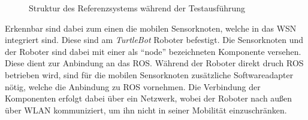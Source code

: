 \begin{figure}[t]
  \begin{center}
  \end{center}
  \caption{Struktur des Referenzsystems während der Testausführung}
  \label{fig:referencetopo}
\end{figure}

Erkennbar sind dabei zum einen die mobilen Sensorknoten, welche in das \gls{WSN} integriert sind.
Diese sind am \textit{TurtleBot} Roboter befestigt. Die Sensorknoten und der Roboter
sind dabei mit einer als ``node'' bezeichneten Komponente versehen. Diese dient zur
Anbindung an das ROS. Während der Roboter direkt druch ROS betrieben wird, sind
für die mobilen Sensorknoten zusätzliche Softwareadapter nötig, welche die
Anbindung zu ROS vornehmen. Die Verbindung der Komponenten erfolgt dabei über ein
Netzwerk, wobei der Roboter nach außen über WLAN kommuniziert, um ihn nicht in seiner
Mobilität einzuschränken.
